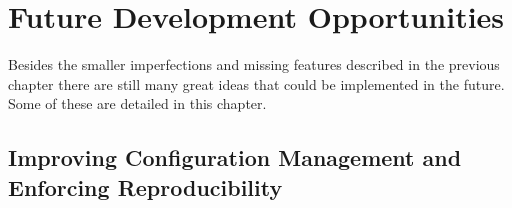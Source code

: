 %

\chapter{Future Development Opportunities \label{ch7}}

Besides the smaller imperfections and missing features described in the
previous chapter there are still many great ideas that could be implemented in
the future. Some of these are detailed in this chapter.

\section{Improving Configuration Management and Enforcing Reproducibility}


